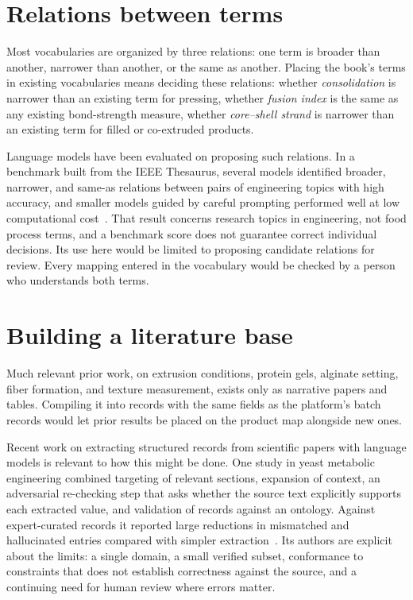 \documentclass[11pt,openany]{book}
\theoremstyle{definition}
\begin{document}
\section{Relations between terms}

Most vocabularies are organized by three relations: one term is broader than another, narrower than another, or the same as another. Placing the book's terms in existing vocabularies means deciding these relations: whether \emph{consolidation} is narrower than an existing term for pressing, whether \emph{fusion index} is the same as any existing bond-strength measure, whether \emph{core--shell strand} is narrower than an existing term for filled or co-extruded products.

Language models have been evaluated on proposing such relations. In a benchmark built from the IEEE Thesaurus, several models identified broader, narrower, and same-as relations between pairs of engineering topics with high accuracy, and smaller models guided by careful prompting performed well at low computational cost~\cite{aggarwal2026}. That result concerns research topics in engineering, not food process terms, and a benchmark score does not guarantee correct individual decisions. Its use here would be limited to proposing candidate relations for review. Every mapping entered in the vocabulary would be checked by a person who understands both terms.

\section{Building a literature base}

Much relevant prior work, on extrusion conditions, protein gels, alginate setting, fiber formation, and texture measurement, exists only as narrative papers and tables. Compiling it into records with the same fields as the platform's batch records would let prior results be placed on the product map alongside new ones.

Recent work on extracting structured records from scientific papers with language models is relevant to how this might be done. One study in yeast metabolic engineering combined targeting of relevant sections, expansion of context, an adversarial re-checking step that asks whether the source text explicitly supports each extracted value, and validation of records against an ontology. Against expert-curated records it reported large reductions in mismatched and hallucinated entries compared with simpler extraction~\cite{yang2027}. Its authors are explicit about the limits: a single domain, a small verified subset, conformance to constraints that does not establish correctness against the source, and a continuing need for human review where errors matter.
\end{document}
